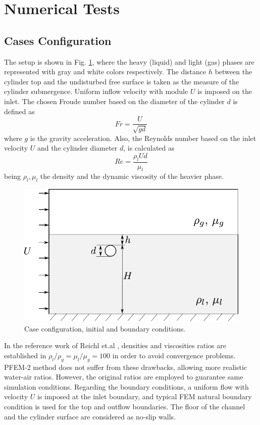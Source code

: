 \section{Numerical Tests}

\subsection{Cases Configuration}

The setup is shown in Fig. \ref{fg:config}, where the heavy (liquid) and light (gas) phases are represented with gray and white colors respectively. The distance $h$ between the cylinder top and the undisturbed free surface is taken as the measure of the cylinder submergence. Uniform inflow velocity with module $U$ is imposed on the inlet. The chosen Froude number based on the diameter of the cylinder $d$ is defined as
\begin{equation}
 Fr = \frac{U}{\sqrt{gd}}
\label{eq:froude}
\end{equation}
where $g$ is the gravity acceleration. Also, the Reynolds number based on the inlet velocity $U$ and the cylinder diameter $d$, is calculated as
\begin{equation}
 Re = \frac{\rho_l U d}{\mu_l}
\label{eq:reynolds}
\end{equation}
being $\rho_l,\mu_l$ the density and the dynamic viscosity of the heavier phase.

\begin{figure}[ht]
  \centering
  \includegraphics[width=0.9\columnwidth]{images_10thspheric/config.pdf}
  \caption{Case configuration, initial and boundary conditions.}
  \label{fg:config}
\end{figure}

In the reference work of Reichl et.al \cite{Reichl05}, densities and viscosities ratios are established in $\rho_l/\rho_g = \mu_l/\mu_g=100$ in order to avoid convergence problems. PFEM-2 method does not suffer from these drawbacks, allowing more realistic water-air ratios. However, the original ratios are employed to guarantee same simulation conditions. Regarding the boundary conditions, a uniform flow with velocity $U$ is imposed at the inlet boundary, and typical FEM natural boundary condition is used for the top and outflow boundaries. The floor of the channel and the cylinder surface are considered as no-slip walls.

